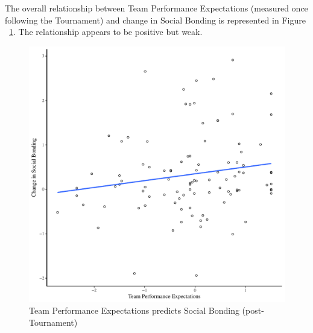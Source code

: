 \begin{CJK}{UTF8}{gbsn}
The overall relationship between Team Performance Expectations (measured once following the Tournament) and change in Social Bonding is represented in Figure ~\ref{fig:teamPerfBondDeltaBasicXY}.  The relationship appears to be positive but weak.

    \begin{figure}[htbp]
      \centering
    \includegraphics[scale=.5]{images/teamPerfBondDeltaBasicXY.pdf}
      \caption{Team Performance Expectations predicts Social Bonding (post-Tournament)}
      \label{fig:teamPerfBondDeltaBasicXY}
    \end{figure}


\end{CJK}
